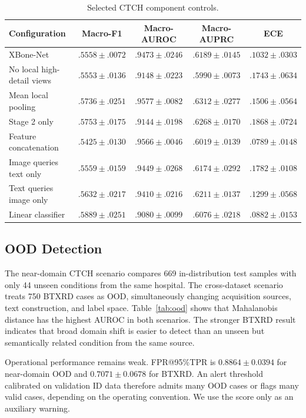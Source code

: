 \documentclass[runningheads]{llncs}
\begin{document}
\begin{table}[t]
\caption{Selected CTCH component controls.}
\label{tab:ablation}
\centering
\scriptsize
\begin{tabular}{lcccc}
\toprule
Configuration & Macro-F1 & Macro-AUROC & Macro-AUPRC & ECE \\
\midrule
XBone-Net & $.5558\pm.0072$ & $.9473\pm.0246$ & $.6189\pm.0145$ & $.1032\pm.0303$ \\
No local high-detail views & $.5553\pm.0136$ & $.9148\pm.0223$ & $.5990\pm.0073$ & $.1743\pm.0634$ \\
Mean local pooling & $.5736\pm.0251$ & \textbf{$.9577\pm.0082$} & \textbf{$.6312\pm.0277$} & $.1506\pm.0564$ \\
Stage 2 only & $.5753\pm.0175$ & $.9144\pm.0198$ & $.6268\pm.0170$ & $.1868\pm.0724$ \\
Feature concatenation & $.5425\pm.0130$ & $.9566\pm.0046$ & $.6019\pm.0139$ & \textbf{$.0789\pm.0148$} \\
Image queries text only & $.5559\pm.0159$ & $.9449\pm.0268$ & $.6174\pm.0292$ & $.1782\pm.0108$ \\
Text queries image only & $.5632\pm.0217$ & $.9410\pm.0216$ & $.6211\pm.0137$ & $.1299\pm.0568$ \\
Linear classifier & \textbf{$.5889\pm.0251$} & $.9080\pm.0099$ & $.6076\pm.0218$ & $.0882\pm.0153$ \\
\bottomrule
\end{tabular}
\end{table}

\subsection{OOD Detection}

The near-domain CTCH scenario compares 669 in-distribution test samples with only 44 unseen conditions from the same hospital. The cross-dataset scenario treats 750 BTXRD cases as OOD, simultaneously changing acquisition sources, text construction, and label space. Table~\ref{tab:ood} shows that Mahalanobis distance has the highest AUROC in both scenarios. The stronger BTXRD result indicates that broad domain shift is easier to detect than an unseen but semantically related condition from the same source.

Operational performance remains weak. FPR@95\%TPR is $0.8864\pm0.0394$ for near-domain OOD and $0.7071\pm0.0678$ for BTXRD. An alert threshold calibrated on validation ID data therefore admits many OOD cases or flags many valid cases, depending on the operating convention. We use the score only as an auxiliary warning.
\end{document}
